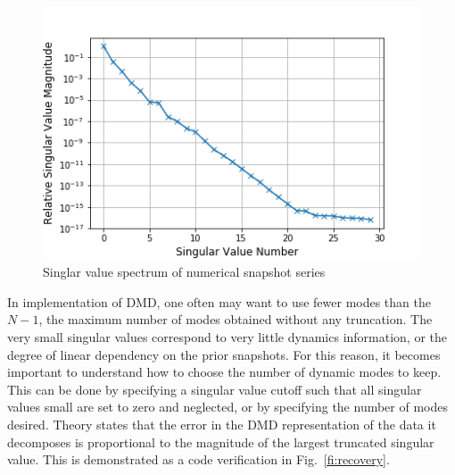 \documentclass[12pt]{article}
\newcommand{\LFI}[1]{\label{fi:#1}}
\newcommand{\FI}[1]{Fig.~\ref{fi:#1}}
\newcommand{\bfg}{\begin{figure}}
\newcommand{\efg}{\end{figure}}
\begin{document}
\bfg[h] \centering
	\includegraphics[scale=0.5]{singularValueSpectrum.png}
	\caption{Singlar value spectrum of numerical snapshot series}
	\LFI{sv-spec}
\efg

In implementation of DMD, one often may want to use fewer modes than the $N-1$, the maximum number of modes obtained without 
any truncation. 
The very small singular values correspond to very little dynamics information, or the degree of linear dependency on the prior snapshots.
For this reason, it becomes important to understand how to choose the number of dynamic modes to keep.
This can be done by specifying a singular value cutoff such that all singular values small are set to zero and neglected, 
or by specifying the number of modes desired.
Theory states that the error in the DMD representation of the data it decomposes is proportional to the magnitude 
of the largest truncated singular value.
This is demonstrated as a code verification in \FI{recovery}.
\end{document}
